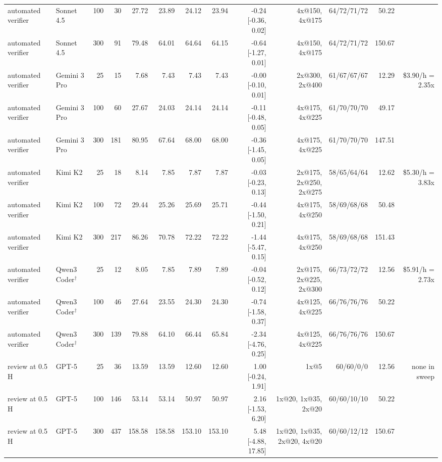 \begin{table}[t]
\begin{tabular}{llrrrrrrrrrrr}
automated verifier & Sonnet 4.5 & 100 & 30 & 27.72 & 23.89 & 24.12 & 23.94 & -0.24 [-0.36, 0.02] & 4x@150, 4x@175 & 64/72/71/72 & 50.22 &  \\
automated verifier & Sonnet 4.5 & 300 & 91 & 79.48 & 64.01 & 64.64 & 64.15 & -0.64 [-1.27, 0.01] & 4x@150, 4x@175 & 64/72/71/72 & 150.67 &  \\
automated verifier & Gemini 3 Pro & 25 & 15 & 7.68 & 7.43 & 7.43 & 7.43 & -0.00 [-0.10, 0.01] & 2x@300, 2x@400 & 61/67/67/67 & 12.29 & \$3.90/h = 2.35x \\
automated verifier & Gemini 3 Pro & 100 & 60 & 27.67 & 24.03 & 24.14 & 24.14 & -0.11 [-0.48, 0.05] & 4x@175, 4x@225 & 61/70/70/70 & 49.17 &  \\
automated verifier & Gemini 3 Pro & 300 & 181 & 80.95 & 67.64 & 68.00 & 68.00 & -0.36 [-1.45, 0.05] & 4x@175, 4x@225 & 61/70/70/70 & 147.51 &  \\
automated verifier & Kimi K2 & 25 & 18 & 8.14 & 7.85 & 7.87 & 7.87 & -0.03 [-0.23, 0.13] & 2x@175, 2x@250, 2x@275 & 58/65/64/64 & 12.62 & \$5.30/h = 3.83x \\
automated verifier & Kimi K2 & 100 & 72 & 29.44 & 25.26 & 25.69 & 25.71 & -0.44 [-1.50, 0.21] & 4x@175, 4x@250 & 58/69/68/68 & 50.48 &  \\
automated verifier & Kimi K2 & 300 & 217 & 86.26 & 70.78 & 72.22 & 72.22 & -1.44 [-5.47, 0.15] & 4x@175, 4x@250 & 58/69/68/68 & 151.43 &  \\
automated verifier & Qwen3 Coder$^\dagger$ & 25 & 12 & 8.05 & 7.85 & 7.89 & 7.89 & -0.04 [-0.52, 0.12] & 2x@175, 2x@225, 2x@300 & 66/73/72/72 & 12.56 & \$5.91/h = 2.73x \\
automated verifier & Qwen3 Coder$^\dagger$ & 100 & 46 & 27.64 & 23.55 & 24.30 & 24.30 & -0.74 [-1.58, 0.37] & 4x@125, 4x@225 & 66/76/76/76 & 50.22 &  \\
automated verifier & Qwen3 Coder$^\dagger$ & 300 & 139 & 79.88 & 64.10 & 66.44 & 65.84 & -2.34 [-4.76, 0.25] & 4x@125, 4x@225 & 66/76/76/76 & 150.67 &  \\
\midrule
review at 0.5 H & GPT-5 & 25 & 36 & 13.59 & 13.59 & 12.60 & 12.60 & 1.00 [-0.24, 1.91] & 1x@5 & 60/60/0/0 & 12.56 & none in sweep \\
review at 0.5 H & GPT-5 & 100 & 146 & 53.14 & 53.14 & 50.97 & 50.97 & 2.16 [-1.53, 6.20] & 1x@20, 1x@35, 2x@20 & 60/60/10/10 & 50.22 &  \\
review at 0.5 H & GPT-5 & 300 & 437 & 158.58 & 158.58 & 153.10 & 153.10 & 5.48 [-4.88, 17.85] & 1x@20, 1x@35, 2x@20, 4x@20 & 60/60/12/12 & 150.67 &  \\

\end{tabular}
\end{table}
